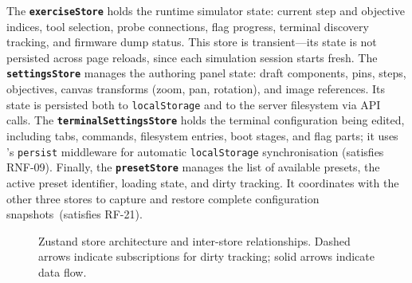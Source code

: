 The \textbf{\texttt{exerciseStore}} holds the runtime simulator state: current step and objective indices, tool selection, probe connections, flag progress, terminal discovery tracking, and firmware dump status. This store is transient---its state is not persisted across page reloads, since each simulation session starts fresh. The \textbf{\texttt{settingsStore}} manages the authoring panel state: draft components, pins, steps, objectives, canvas transforms (zoom, pan, rotation), and image references. Its state is persisted both to \texttt{localStorage} and to the server filesystem via API calls. The \textbf{\texttt{terminalSettingsStore}} holds the terminal configuration being edited, including tabs, commands, filesystem entries, boot stages, and flag parts; it uses \zustand{}'s \texttt{persist} middleware for automatic \texttt{localStorage} synchronisation (satisfies RNF-09). Finally, the \textbf{\texttt{presetStore}} manages the list of available presets, the active preset identifier, loading state, and dirty tracking. It coordinates with the other three stores to capture and restore complete configuration snapshots~(satisfies RF-21).

\begin{figure}[ht]
    \centering
    \caption{Zustand store architecture and inter-store relationships. Dashed arrows indicate subscriptions for dirty tracking; solid arrows indicate data flow.}
    \label{fig:stores}
\end{figure}


